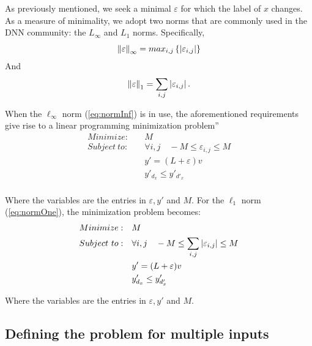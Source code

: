 \documentclass{easychair}
\begin{document}
As previously mentioned, we seek a minimal $\varepsilon$ for which the
label of $x$ changes. As a measure of minimality, we adopt two norms
that are commonly used in the DNN community: the $L_\infty$ and $L_1$
norms. Specifically, 
\begin{equation}
\label{eq:normInf}
   		\left\lVert\varepsilon\right\rVert_{\infty}=max_{i,j}\left\lbrace \left\lvert\varepsilon_{i,j}\right\rvert\right\rbrace
\end{equation}
And
\begin{equation}
\label{eq:normOne}
   		\left\lVert\varepsilon\right\rVert_1=\sum_{i,j}\left\lvert\varepsilon_{i,j}\right\rvert.
\end{equation}

When the $\ell_\infty$ norm (\ref{eq:normInf}) is in use, the
aforementioned requirements give rise to a linear programming
minimization problem''
\begin{align*}
\label{eq:LP}
    Minimize:\quad & M \\
    Subject\ to:\quad & \forall i,j\quad -M \leq\varepsilon_{i,j}\leq M \\
    & y'=(L+\varepsilon)v \\
    & y'_{d_x} \leq y'_{d'_x} \\
\end{align*}

Where the variables are the entries in $\varepsilon,y'$ and $M$.
For the $\ell_1$ norm (\ref{eq:normOne}), the minimization problem becomes:
\begin{eqnarray*}
\label{eq:NotLP}
    Minimize:\quad & M \\
    Subject\ to:\quad & \forall i,j\quad -M \leq\sum_{i,j}\left\lvert\varepsilon_{i,j}\right\rvert\leq M \\
    & y'=(L+\varepsilon)v \\
    & y'_{d_x} \leq y'_{d'_x} \\
\end{eqnarray*}

Where the variables are the entries in $\varepsilon,y'$ and $M$.

        
\subsection{Defining the problem for multiple inputs}
\label{sec:defineProblem2}
\end{document}
